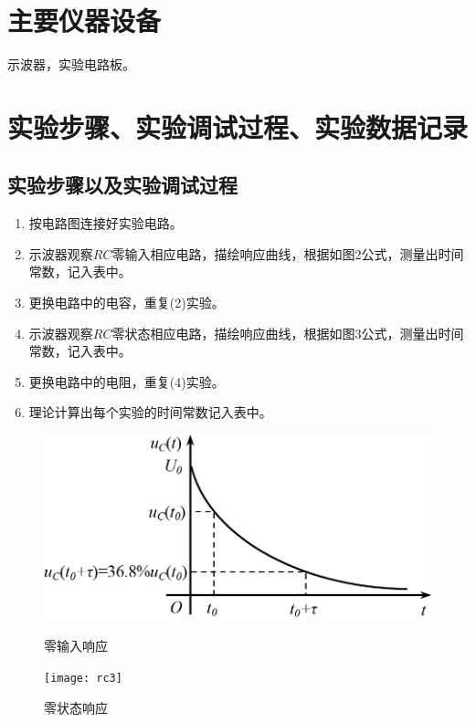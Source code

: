 \documentclass{../source/Experiment}
\begin{document}
    \section{主要仪器设备}
            示波器，实验电路板。
    \section{实验步骤、实验调试过程、实验数据记录}
        \subsection{实验步骤以及实验调试过程}
            \begin{enumerate}
                \item 按电路图连接好实验电路。
                \item 示波器观察$RC$零输入相应电路，描绘响应曲线，根据如图2公式，测量出时间常数，记入表中。
                \item 更换电路中的电容，重复(2)实验。
                \item 示波器观察$RC$零状态相应电路，描绘响应曲线，根据如图3公式，测量出时间常数，记入表中。
                \item 更换电路中的电阻，重复(4)实验。
                \item 理论计算出每个实验的时间常数记入表中。
            \end{enumerate}
            \begin{figure}[htbp]          
                \begin{minipage}[t]{0.5\textwidth}
                    \centering
                    \includegraphics[scale=0.8]{pic/rc2.png}
                    \caption{零输入响应\label{fig:1}}
                \end{minipage}
                \qquad
                \begin{minipage}[t]{0.5\textwidth}
                    \centering
                    \texttt{[image: rc3]}
                    \caption{零状态响应\label{fig:2}}
                \end{minipage}
            \end{figure}
\end{document}
